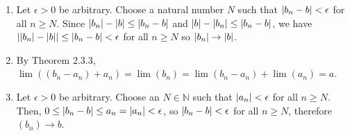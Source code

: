 \documentclass{article}
\DeclarePairedDelimiter\abs{\lvert}{\rvert}
\newcommand{\N}{\mathbb{N}}
\begin{document}
\begin{enumerate}
\begin{enumerate}
		\item Let $\epsilon > 0$ be arbitrary. Choose a natural number $N$ such that $\abs{b_n - b} < \epsilon$ for all $n \geq N$. Since $\abs{b_n} - \abs{b} \leq \abs{b_n - b}$ and $\abs{b} - \abs{b_n} \leq \abs{b_n - b}$, we have $\abs{\abs{b_n}-\abs{b}} \leq \abs{b_n-b} < \epsilon$ for all $n \geq N$ so $\abs{b_n} \rightarrow \abs{b}$.
		      		      		      	     
		\item By Theorem 2.3.3, $\lim ((b_n-a_n) + a_n) = \lim(b_n) = \lim (b_n - a_n) + \lim(a_n) = a$.
		      		      		      	     
		\item Let $\epsilon > 0$ be arbitrary. Choose an $N \in \N$ such that $\abs{a_n} < \epsilon$ for all $n \geq N$. Then, $0 \leq \abs{b_n-b} \leq a_n = \abs{a_n} < \epsilon$, so $\abs{b_n - b} < \epsilon$ for all $n \geq N$, therefore $(b_n) \rightarrow b$.
	\end{enumerate}
				 

\end{enumerate}
\end{document}
